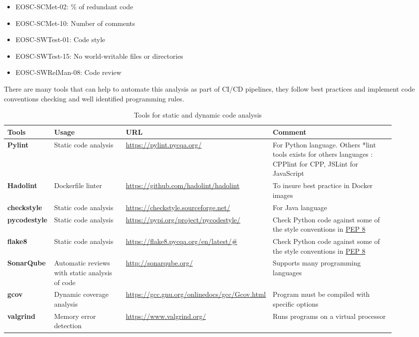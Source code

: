 \begin{itemize}
  \item EOSC-SCMet-02: \% of redundant code
  \item EOSC-SCMet-10: Number of comments
  \item EOSC-SWTest-01: Code style
  \item EOSC-SWTest-15: No world-writable files or directories
  \item EOSC-SWRelMan-08: Code review
\end{itemize}

There are many tools that can help to automate this analysis as part of CI/CD pipelines, they follow best practices and implement code conventions checking and well identified programming rules.

\begin{center}
\begin{table}[h]

  \small
  \begin{tabular}{|p{0.12\linewidth}|p{0.2\linewidth}|p{0.25\linewidth}|p{0.35\linewidth}|} \hline

    \textbf{Tools} & \textbf{Usage} & \textbf{URL} & \textbf{Comment} \\ \hline \hline
    \textbf{Pylint} & Static code analysis & \url{https://pylint.pycqa.org/} & For Python language. Others *lint tools exists for others languages : CPPlint for CPP, JSLint for JavaScript \\ \hline
    \textbf{Hadolint} & Dockerfile linter & \url{https://github.com/hadolint/hadolint} & To insure best practice in Docker images \\ \hline
    \textbf{checkstyle} & Static code analysis & \url{https://checkstyle.sourceforge.net/} & For Java language  \\ \hline
    \textbf{pycodestyle} & Static code analysis & \url{https://pypi.org/project/pycodestyle/} & Check Python code against some of the style conventions in \href{http://www.python.org/dev/peps/pep-0008/}{PEP 8}  \\ \hline
    \textbf{flake8} & Static code analysis & \url{https://flake8.pycqa.org/en/latest/#} & Check Python code against some of the style conventions in \href{http://www.python.org/dev/peps/pep-0008/}{PEP 8} \\ \hline
    \textbf{SonarQube} & Automatic reviews with static analysis of code & \url{http://sonarqube.org/} & Supports many programming languages  \\ \hline
    \textbf{gcov} & Dynamic coverage analysis & \url{https://gcc.gnu.org/onlinedocs/gcc/Gcov.html} & Program must be compiled with specific options  \\ \hline
    \textbf{valgrind} & Memory error detection & \url{https://www.valgrind.org/} & Runs programs on a virtual processor  \\ \hline

  \end{tabular}
  \caption{Tools for static and dynamic code analysis}
  \label{tab:tools_pack03}
\end{table}
\end{center}

